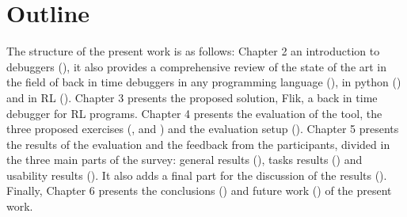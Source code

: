 \section{Outline}
The structure of the present work is as follows: Chapter 2 an introduction to debuggers (),
it also provides a comprehensive review of the state of the art in the field of back in 
time debuggers in any programming language (), in python ()
and in \ac{RL} (). Chapter 3 presents the proposed solution, \ac{Flik}, 
a back in time debugger for \ac{RL} programs. Chapter 4 presents the evaluation of the tool,
the three proposed exercises (,  and 
) and the evaluation setup (). Chapter 5 presents the 
results of the evaluation and the feedback from the participants, divided in the 
three main parts of the survey: general results (), tasks 
results () and usability results (). It also adds 
a final part for the discussion of the results (). 
Finally, Chapter 6 presents the conclusions () 
and future work () of the present work.

\endinput

